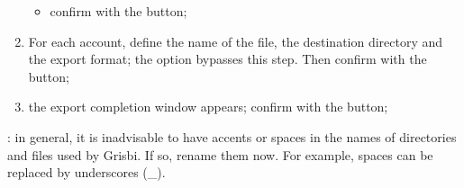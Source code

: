 \begin{enumerate}
\begin{itemize}
			\item confirm with the  button;
		\end{itemize}
	\item For each account, define the name of the file, the destination directory and the export format; the option  bypasses this step. Then confirm with the  button;
	\item the export completion window appears; confirm with the  button;
\end{enumerate}

\Attention{}: in general, it is inadvisable to have accents or spaces in the names of directories and files used by Grisbi. If so, rename them now. For example, spaces can be replaced by underscores (\_).
